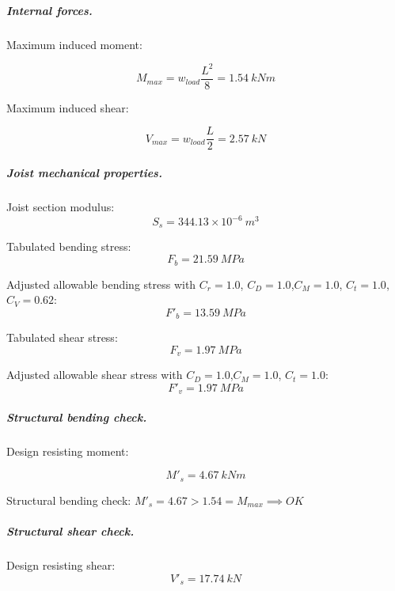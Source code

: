 \subparagraph{Internal forces.}

\noindent Maximum induced moment:

\begin{equation}
  M_{max}= w_{load} \frac{L^2}{8}= 1.54\ kN m
\end{equation}

\noindent Maximum induced shear:

\begin{equation}
  V_{max}= w_{load} \frac{L}{2}= 2.57\ kN
\end{equation}

\subparagraph{Joist mechanical properties.}

\noindent Joist section modulus:
\begin{equation}
  S_s= 344.13 \times 10^{-6}\ m^3
\end{equation}

\noindent Tabulated bending stress:
\begin{equation}
  F_b= 21.59\ MPa
\end{equation}


\noindent Adjusted allowable bending stress with $C_r= 1.0$, $C_D= 1.0$,$C_M= 1.0$, $C_t= 1.0$,$C_V= 0.62$:
\begin{equation}
  F'_b= 13.59\ MPa
\end{equation}

\noindent Tabulated shear stress:
\begin{equation}
  F_v= 1.97\ MPa
\end{equation}

\noindent Adjusted allowable shear stress with $C_D= 1.0$,$C_M= 1.0$, $C_t= 1.0$:
\begin{equation}
  F'_v= 1.97\ MPa
\end{equation}

\subparagraph{Structural bending check.}

\noindent Design resisting moment:

\begin{equation}
  M'_s= 4.67\ kN m
\end{equation}

\noindent Structural bending check: $M'_s = 4.67 > 1.54 = M_{max} \implies OK$

\subparagraph{Structural shear check.}

\noindent Design resisting shear:
\begin{equation}
  V'_s= 17.74\ kN
\end{equation}

